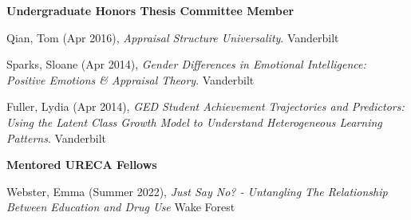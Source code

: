 {\large\textbf{Undergraduate Honors Thesis Committee Member}}
\begin{etaremune}
\item Qian, Tom (Apr 2016), \textit{Appraisal Structure Universality}. Vanderbilt%
%
\item Sparks, Sloane (Apr 2014), \textit{Gender Differences in Emotional Intelligence: Positive Emotions \& Appraisal Theory}. Vanderbilt%
\item Fuller, Lydia (Apr 2014), \textit{GED Student Achievement Trajectories and Predictors: Using the Latent Class Growth Model to Understand Heterogeneous Learning Patterns}. Vanderbilt%
\end{etaremune}


{\large\textbf{Mentored URECA Fellows}}
\begin{etaremune}%
\item Webster, Emma (Summer 2022), \textit{Just Say No? - Untangling The Relationship Between Education and Drug Use} Wake Forest%
\end{etaremune}%
